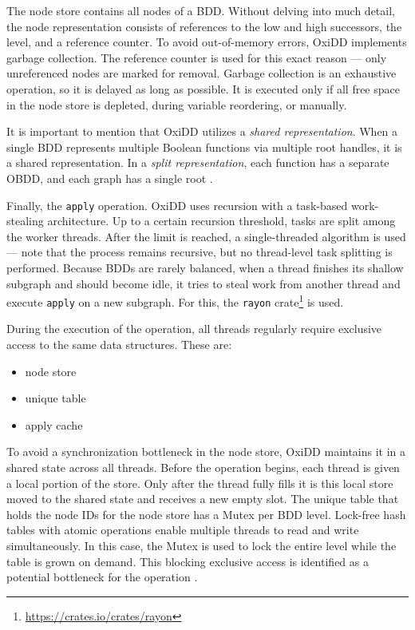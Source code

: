 The node store contains all nodes of a BDD. Without delving into much detail, the node representation consists of
references to the low and high successors, the level, and a reference counter. To avoid out-of-memory errors, OxiDD
implements garbage collection. The reference counter is used for this exact reason --- only unreferenced nodes are
marked for removal. Garbage collection is an exhaustive operation, so it is delayed as long as possible. It is
executed only if all free space in the node store is depleted, during variable reordering, or manually.

It is important to mention that OxiDD utilizes a \textit{shared representation}. When a single BDD represents
multiple Boolean functions via multiple root handles, it is a shared representation. In a \textit{split
representation}, each function has a separate OBDD, and each graph has a single root \cite{bdds, bfs-bdd, bdds-older}.

Finally, the \texttt{apply} operation. OxiDD uses recursion with a task-based work-stealing architecture. Up to a
certain recursion threshold, tasks are split among the worker threads. After the limit is reached, a single-threaded
algorithm is used \cite{oxidd} --- note that the process remains recursive, but no thread-level task splitting is
performed. Because BDDs are rarely balanced, when a thread finishes its shallow subgraph and should become idle, it
tries to steal work from another thread and execute \texttt{apply} on a new subgraph. For this, the \texttt{rayon}
crate\footnote{\url{https://crates.io/crates/rayon}} is used.

During the execution of the operation, all threads regularly require exclusive access to the same data structures.
These are:

\begin{itemize}
    \item node store
    \item unique table
    \item apply cache
\end{itemize}

To avoid a synchronization bottleneck in the node store, OxiDD maintains it in a shared state across all threads.
Before the operation begins, each thread is given a local portion of the store. Only after the thread fully fills it
is this local store moved to the shared state and receives a new empty slot. The unique table that holds the node IDs
for the node store has a Mutex per BDD level. Lock-free hash tables with atomic operations enable multiple threads to
read and write simultaneously. In this case, the Mutex is used to lock the entire level while the table is grown on
demand. This blocking exclusive access is identified as a potential bottleneck for the operation \cite{oxidd}.

